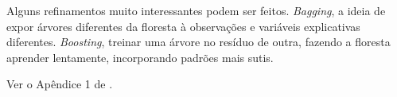  
  

 
 
Alguns refinamentos muito interessantes podem ser feitos. \textit{Bagging}, a ideia de expor árvores diferentes da floresta à observações e variáveis explicativas diferentes. \textit{Boosting}, treinar uma árvore no resíduo de outra, fazendo a floresta aprender lentamente, incorporando padrões mais sutis. 
 
 
 
 \begin{prova}
 Ver o Apêndice 1 de . \blacksquare
 \end{prova}
